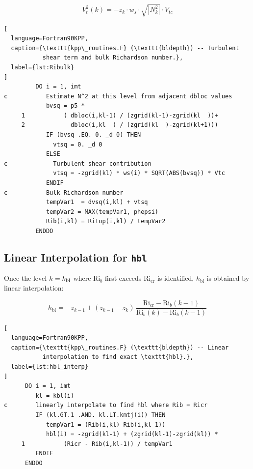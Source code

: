 \documentclass[12pt,letterpaper]{article}
\newcommand{\hbl}{h_{\mathrm{bl}}}
\newcommand{\Ri}{\mathrm{Ri}}
\newcommand{\Ricr}{\mathrm{Ri_{cr}}}
\begin{document}
\begin{equation}  
V_t^2(k) = -z_k \cdot w_s \cdot \sqrt{|N_k^2|} \cdot V_{tc}  
\end{equation}  
  
\begin{lstlisting}[  
  language=Fortran90KPP,  
  caption={\texttt{kpp\_routines.F} (\texttt{bldepth}) -- Turbulent  
           shear term and bulk Richardson number.},  
  label={lst:Ribulk}  
]  
         DO i = 1, imt  
c           Estimate N^2 at this level from adjacent dbloc values  
            bvsq = p5 *  
     1           ( dbloc(i,kl-1) / (zgrid(kl-1)-zgrid(kl  ))+  
     2             dbloc(i,kl  ) / (zgrid(kl  )-zgrid(kl+1)))  
            IF (bvsq .EQ. 0. _d 0) THEN  
              vtsq = 0. _d 0  
            ELSE  
c             Turbulent shear contribution  
              vtsq = -zgrid(kl) * ws(i) * SQRT(ABS(bvsq)) * Vtc  
            ENDIF  
c           Bulk Richardson number  
            tempVar1  = dvsq(i,kl) + vtsq  
            tempVar2 = MAX(tempVar1, phepsi)  
            Rib(i,kl) = Ritop(i,kl) / tempVar2  
         ENDDO  
\end{lstlisting}  
  
\subsection{Linear Interpolation for \texttt{hbl}}  
  
Once the level $k = k_{\rm bl}$ where $\Ri_b$ first exceeds $\Ricr$ is  
identified, $\hbl$ is obtained by linear interpolation:  
  
\begin{equation}  
\hbl = -z_{k-1} + (z_{k-1} - z_k)\,\frac{\Ricr - \Ri_b(k-1)}  
                                          {\Ri_b(k) - \Ri_b(k-1)}  
\end{equation}  
  
\begin{lstlisting}[  
  language=Fortran90KPP,  
  caption={\texttt{kpp\_routines.F} (\texttt{bldepth}) -- Linear  
           interpolation to find exact \texttt{hbl}.},  
  label={lst:hbl_interp}  
]  
      DO i = 1, imt  
         kl = kbl(i)  
c        linearly interpolate to find hbl where Rib = Ricr  
         IF (kl.GT.1 .AND. kl.LT.kmtj(i)) THEN  
            tempVar1 = (Rib(i,kl)-Rib(i,kl-1))  
            hbl(i) = -zgrid(kl-1) + (zgrid(kl-1)-zgrid(kl)) *  
     1           (Ricr - Rib(i,kl-1)) / tempVar1  
         ENDIF  
      ENDDO  
\end{lstlisting}  
  
\end{document}
